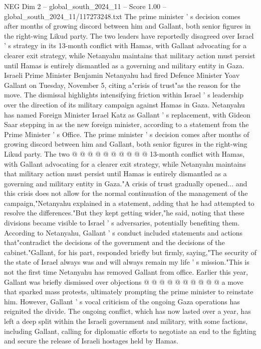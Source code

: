 \begin{textsample}{NEG Dim 2 – global\_south\_2024\_11 – Score 1.00 – global\_south\_2024\_11/117273248.txt}  \label{ex:f2_neg_204}
The prime minister ' s decision comes after months of growing discord between him and Gallant, both senior figures in the right-wing Likud party.
The two leaders have reportedly disagreed over Israel ' s strategy in its 13-month conflict with Hamas, with Gallant advocating for a clearer exit strategy, while Netanyahu maintains that military action must persist until Hamas is entirely dismantled as a governing and military entity in Gaza.
Israeli Prime Minister Benjamin Netanyahu had fired Defence Minister Yoav Gallant on Tuesday, November 5, citing a"crisis of trust"as the reason for the move.
The dismissal highlights intensifying friction within Israel ' s leadership over the direction of its military campaign against Hamas in Gaza.
Netanyahu has named Foreign Minister Israel Katz as Gallant ' s replacement, with Gideon Saar stepping in as the new foreign minister, according to a statement from the Prime Minister ' s Office.
The prime minister ' s decision comes after months of growing discord between him and Gallant, both senior figures in the right-wing Likud party.
The two @ @ @ @ @ @ @ @ @ @ 13-month conflict with Hamas, with Gallant advocating for a clearer exit strategy, while Netanyahu maintains that military action must persist until Hamas is entirely dismantled as a governing and military entity in Gaza."A crisis of trust gradually opened... and this crisis does not allow for the normal continuation of the management of the campaign,"Netanyahu explained in a statement, adding that he had attempted to resolve the differences."But they kept getting wider,"he said, noting that these divisions became visible to Israel ' s adversaries, potentially benefiting them.
According to Netanyahu, Gallant ' s conduct included statements and actions that"contradict the decisions of the government and the decisions of the cabinet."Gallant, for his part, responded briefly but firmly, saying,"The security of the state of Israel always was and will always remain my life ' s mission."This is not the first time Netanyahu has removed Gallant from office.
Earlier this year, Gallant was briefly dismissed over objections @ @ @ @ @ @ @ @ @ @ a move that sparked mass protests, ultimately prompting the prime minister to reinstate him.
However, Gallant ' s vocal criticism of the ongoing Gaza operations has reignited the divide.
The ongoing conflict, which has now lasted over a year, has left a deep split within the Israeli government and military, with some factions, including Gallant, calling for diplomatic efforts to negotiate an end to the fighting and secure the release of Israeli hostages held by Hamas.

\end{textsample}
